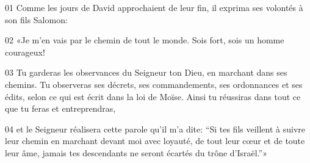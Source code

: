01 Comme les jours de David approchaient de leur fin, il exprima ses volontés à son fils Salomon:

02 «Je m’en vais par le chemin de tout le monde. Sois fort, sois un homme courageux!

03 Tu garderas les observances du Seigneur ton Dieu, en marchant dans ses chemins. Tu observeras ses décrets, ses commandements, ses ordonnances et ses édits, selon ce qui est écrit dans la loi de Moïse. Ainsi tu réussiras dans tout ce que tu feras et entreprendras,

04 et le Seigneur réalisera cette parole qu’il m’a dite: “Si tes fils veillent à suivre leur chemin en marchant devant moi avec loyauté, de tout leur cœur et de toute leur âme, jamais tes descendants ne seront écartés du trône d’Israël.”»
